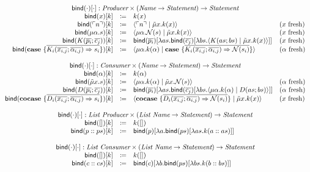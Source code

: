 \documentclass[nonacm]{acmart}
\newcommand{\lit}[1]{\ensuremath{\ulcorner #1 \urcorner}}
\newcommand{\cut}[2]{\ensuremath{\langle #1 \mid #2 \rangle}}
\newcommand{\case}[1]{\ensuremath{\mathbf{case}\ \{ #1 \}}}
\newcommand{\cocase}[1]{\ensuremath{\mathbf{cocase}\ \{ #1 \}}}
\newcommand{\name}[1]{\ensuremath{\mathcal{N}(#1)}}
\newcommand{\bind}[2]{\ensuremath{\mathsf{bind}(#1)[#2]}}
\newcommand{\fresh}[1]{\ensuremath{(#1\text{ fresh})}}
\begin{document}
\[
  \begin{array}{rcll}
    \multicolumn{4}{c}{\bind{\cdot}{\cdot} : \emph{Producer} \times (\emph{Name} \rightarrow \emph{Statement}) \rightarrow \emph{Statement}}\\
    \bind{x}{k} & \coloneq & k(x) & \\
    \bind{\lit{n}}{k} & \coloneq & \cut{\lit{n}}{\tilde{\mu}x.k(x)} & \fresh{x} \\
    \bind{\mu\alpha.s}{k} & \coloneq & \cut{\mu\alpha.\name{s}}{\tilde{\mu}x.k(x)} & \fresh{x} \\
    \bind{K(\overline{p_i}; \overline{c_{j}})}{k} & \coloneq & \bind{\overline{p_i}}{\lambda as.\bind{\overline{c_j}}{\lambda bs.\cut{K(as; bs)}{\tilde{\mu}x.k(x)}}} & \fresh{x} \\
    \bind{\case{\overline{K_i(\overline{x_{i,j}}; \overline{\alpha_{i,j}}) \Rightarrow s_i}}}{k} & \coloneq & \cut{\mu\alpha.k(\alpha)}{\case{\overline{K_i(\overline{x_{i,j}}; \overline{\alpha_{i,j}}) \Rightarrow \name{s_i}}}} & \fresh{\alpha} \\
    \\
    \multicolumn{4}{c}{\bind{\cdot}{\cdot} : \emph{Consumer} \times (\emph{Name} \rightarrow \emph{Statement}) \rightarrow \emph{Statement}}\\
    \bind{\alpha}{k} & \coloneq & k(\alpha) & \\
    \bind{\tilde{\mu}x.s}{k} & \coloneq & \cut{\mu\alpha.k(\alpha)}{\tilde{\mu}x.\name{s}} & \fresh{\alpha} \\
    \bind{D(\overline{p_i}; \overline{c_{j}})}{k} & \coloneq & \bind{\overline{p_i}}{\lambda as.\bind{\overline{c_j}}{\lambda bs.\cut{\mu\alpha.k(\alpha)}{D(as; bs)}}} & \fresh{\alpha} \\
    \bind{\cocase{\overline{D_i(\overline{x_{i,j}}; \overline{\alpha_{i,j}}) \Rightarrow s_i}}}{k} & \coloneq & \cut{\cocase{\overline{D_i(\overline{x_{i,j}}; \overline{\alpha_{i,j}}) \Rightarrow \name{s_i}}}}{\tilde{\mu}x.k(x)} & \fresh{x} \\
    \\
    \multicolumn{4}{c}{\bind{\cdot}{\cdot} : \emph{List Producer} \times (\emph{List Name} \rightarrow \emph{Statement}) \rightarrow \emph{Statement}}\\
    \bind{[]}{k} & \coloneq & k([]) & \\
    \bind{p :: ps}{k} & \coloneq & \bind{p}{\lambda a.\bind{ps}{\lambda as.k(a :: as)}} & \\
    \\
    \multicolumn{4}{c}{\bind{\cdot}{\cdot} : \emph{List Consumer} \times (\emph{List Name} \rightarrow \emph{Statement}) \rightarrow \emph{Statement}}\\
    \bind{[]}{k} & \coloneq & k([]) & \\
    \bind{c :: cs}{k} & \coloneq & \bind{c}{\lambda b.\bind{ps}{\lambda bs.k(b :: bs)}} & \\
  \end{array}
\]
\end{document}
